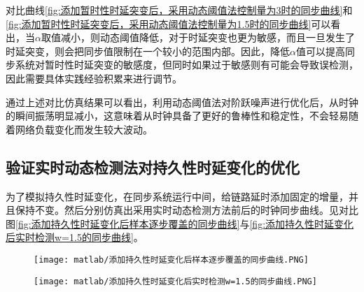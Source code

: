 对比曲线\ref{fig:添加暂时性时延突变后，采用动态阈值法控制量为3时的同步曲线}和\ref{fig:添加暂时性时延突变后，采用动态阈值法控制量为1.5时的同步曲线}可以看出，当$\alpha$取值减小，则动态阈值降低，对于时延突变也更为敏感，而且一旦发生了时延突变，则会把同步值限制在一个较小的范围内部。因此，降低$\alpha$值可以提高同步系统对暂时性时延突变的敏感度，但同时如果过于敏感则有可能会导致误检测，因此需要具体实践经验积累来进行调节。

通过上述对比仿真结果可以看出，利用动态阈值法对阶跃噪声进行优化后，从时钟的瞬间振荡明显减小，这意味着从时钟具备了更好的鲁棒性和稳定性，不会轻易随着网络负载变化而发生较大波动。

\subsection{验证实时动态检测法对持久性时延变化的优化}
为了模拟持久性时延变化，在同步系统运行中间，给链路延时添加固定的增量，并且保持不变。然后分别仿真出采用实时动态检测方法前后的时钟同步曲线。见对比图\ref{fig:添加持久性时延变化后样本逐步覆盖的同步曲线}与\ref{fig:添加持久性时延变化后实时检测w=1.5的同步曲线}。
\begin{figure}[htbp]
  \centering
  \begin{minipage}[b]{1\textwidth}
    \captionstyle{\centering}
    \centering
    \texttt{[image: matlab/添加持久性时延变化后样本逐步覆盖的同步曲线.PNG]}
  \end{minipage}     
\end{figure}
\begin{figure}[htbp]
  \centering
  \begin{minipage}[b]{1\textwidth}
    \captionstyle{\centering}
    \centering
    \texttt{[image: matlab/添加持久性时延变化后实时检测w=1.5的同步曲线.PNG]}
  \end{minipage}     
\end{figure}
\\ \\ \\ \\ \\ \\ \\ 

